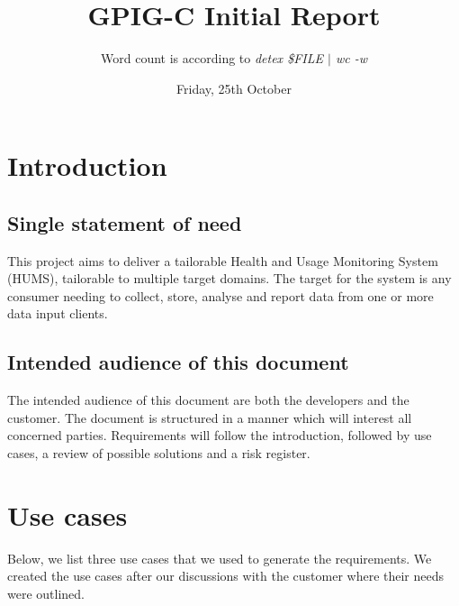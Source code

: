 \documentclass[10pt,a4paper]{article}
\begin{document}
\title{\vspace{-1cm}GPIG-C Initial Report}
\author{Word count is according to \textsl{detex \$FILE $\vert$ wc -w}}
\date{Friday, 25th October}
\maketitle
\thispagestyle{fancy} %

\section{Introduction}

\subsection{Single statement of need}
This project aims to deliver a tailorable Health and Usage Monitoring System
(HUMS), tailorable to multiple target domains. The target for the system is any
consumer needing to collect, store, analyse and report data from one or more
data input clients.

\subsection{Intended audience of this document}
The intended audience of this document are both the developers and the customer.
The document is structured in a manner which will interest all concerned
parties. Requirements will follow the introduction, followed by use cases, a
review of possible solutions and a risk register.

\section{Use cases}
Below, we list three use cases that we used to generate the requirements. We created the use cases after our discussions with the customer where their needs were outlined.\\
\end{document}
